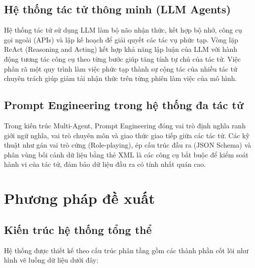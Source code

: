 \documentclass[11pt,a4paper]{article}
\begin{document}
\subsection{Hệ thống tác tử thông minh (LLM Agents)}
Hệ thống tác tử sử dụng LLM làm bộ não nhận thức, kết hợp bộ nhớ, công cụ gọi ngoài (APIs) và lập kế hoạch để giải quyết các tác vụ phức tạp. Vòng lặp ReAct (Reasoning and Acting) kết hợp khả năng lập luận của LLM với hành động tương tác công cụ theo từng bước giúp tăng tính tự chủ của tác tử. Việc phân rã một quy trình làm việc phức tạp thành sự cộng tác của nhiều tác tử chuyên trách giúp giảm tải nhận thức trên từng phiên làm việc của mô hình.

\subsection{Prompt Engineering trong hệ thống đa tác tử}
Trong kiến trúc Multi-Agent, Prompt Engineering đóng vai trò định nghĩa ranh giới ngữ nghĩa, vai trò chuyên môn và giao thức giao tiếp giữa các tác tử. Các kỹ thuật như gán vai trò cứng (Role-playing), ép cấu trúc đầu ra (JSON Schema) và phân vùng bối cảnh dữ liệu bằng thẻ XML là các công cụ bắt buộc để kiểm soát hành vi của tác tử, đảm bảo dữ liệu đầu ra có tính nhất quán cao.



\section{Phương pháp đề xuất}

\subsection{Kiến trúc hệ thống tổng thể}
Hệ thống được thiết kế theo cấu trúc phân tầng gồm các thành phần cốt lõi như hình vẽ luồng dữ liệu dưới đây:\par
\end{document}
